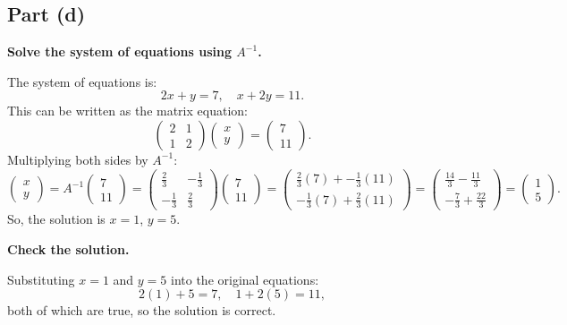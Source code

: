 \documentclass[11pt]{article}
\begin{document}
\newpage

\subsection{Part (d)}
\textbf{Solve the system of equations using $A^{-1}$.}

The system of equations is:
\[
2x + y = 7, \quad x + 2y = 11.
\]
This can be written as the matrix equation:
\[
\begin{pmatrix} 2 & 1 \\ 1 & 2 \end{pmatrix} \begin{pmatrix} x \\ y \end{pmatrix} = \begin{pmatrix} 7 \\ 11 \end{pmatrix}.
\]
Multiplying both sides by $A^{-1}$:
\[
\begin{pmatrix} x \\ y \end{pmatrix} = A^{-1} \begin{pmatrix} 7 \\ 11 \end{pmatrix}
= \begin{pmatrix} \frac{2}{3} & -\frac{1}{3} \\ -\frac{1}{3} & \frac{2}{3} \end{pmatrix} \begin{pmatrix} 7 \\ 11 \end{pmatrix}
= \begin{pmatrix} \frac{2}{3}(7) + -\frac{1}{3}(11) \\ -\frac{1}{3}(7) + \frac{2}{3}(11) \end{pmatrix}
= \begin{pmatrix} \frac{14}{3} - \frac{11}{3} \\ -\frac{7}{3} + \frac{22}{3} \end{pmatrix}
= \begin{pmatrix} 1 \\ 5 \end{pmatrix}.
\]
So, the solution is $x = 1$, $y = 5$.

\textbf{Check the solution.}

Substituting $x = 1$ and $y = 5$ into the original equations:
\[
2(1) + 5 = 7, \quad 1 + 2(5) = 11,
\]
both of which are true, so the solution is correct.

\newpage
\end{document}
